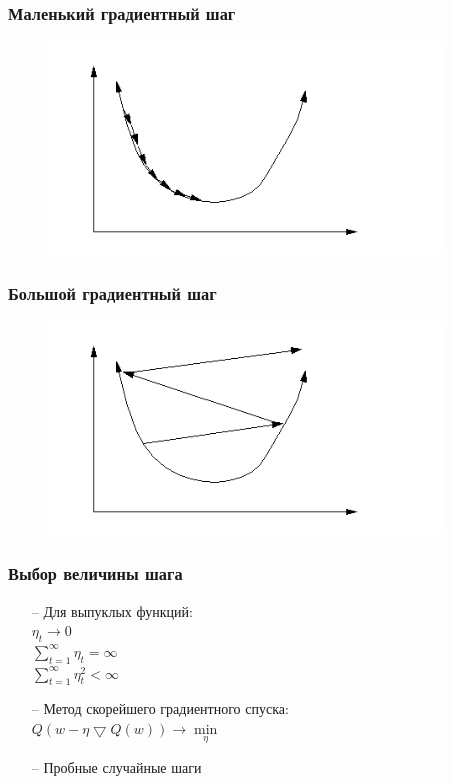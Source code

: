 \documentclass[12pt]{beamer}
\begin{document}
\begin{frame}\frametitle{Маленький градиентный шаг}
\begin{figure}[htbp]
  \includegraphics[height=160pt, keepaspectratio = true]{images/learning_rate_small}   
\end{figure}
\end{frame}

\begin{frame}\frametitle{Большой градиентный шаг}
\begin{figure}[htbp]
  \includegraphics[height=160pt, keepaspectratio = true]{images/learning_rate_large}   
\end{figure}
\end{frame}

\begin{frame}\frametitle{Выбор величины шага}
\begin{itemize}
\item[--] Для выпуклых функций:\\
$\eta_t \rightarrow 0$\\
$\sum\limits_{t = 1}^\infty \eta_t = \infty$\\
$\sum\limits_{t = 1}^\infty \eta_t^2 < \infty$\\

\item[--] Метод скорейшего градиентного спуска:\\
$Q(w - \eta \bigtriangledown Q(w)) \rightarrow \min\limits_{\eta}$
\item[--] Пробные случайные шаги
\end{itemize}
\end{frame}
\end{document}
